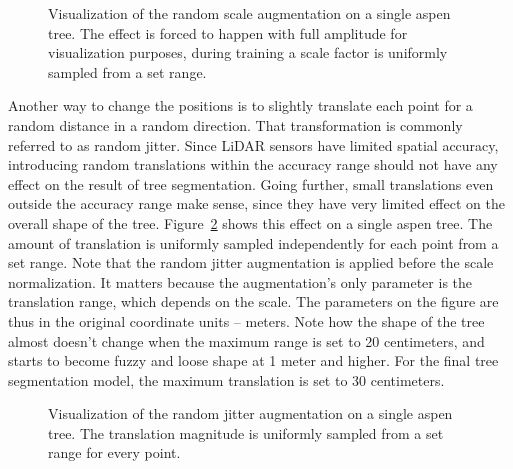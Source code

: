 \begin{figure}
\caption[Visualization of the random scale augmentation on a single aspen tree.]{\label{fig-random-scale-effect}Visualization of the random
scale augmentation on a single aspen tree. The effect is forced to
happen with full amplitude for visualization purposes, during training a
scale factor is uniformly sampled from a set range.}
\end{figure}

Another way to change the positions is to slightly translate each point for a random distance in a random direction.
That transformation is commonly referred to as random jitter.
Since LiDAR sensors have limited spatial accuracy, introducing random translations within the accuracy range should not have any effect on the result of tree segmentation.
Going further, small translations even outside the accuracy range make sense, since they have very limited effect on the overall shape of the tree.
Figure~\ref{fig-random-jitter-effect} shows this effect on a single aspen tree.
The amount of translation is uniformly sampled independently for each point from a set range.
Note that the random jitter augmentation is applied before the scale normalization.
It matters because the augmentation's only parameter is the translation range, which depends on the scale.
The parameters on the figure are thus in the original coordinate units – meters.
Note how the shape of the tree almost doesn't change when the maximum range is set to 20 centimeters, and starts to become fuzzy and loose shape at 1 meter and higher.
For the final tree segmentation model, the maximum translation is set to 30 centimeters.

\begin{figure}
\caption[Visualization of the random jitter augmentation on a single aspen tree.]{\label{fig-random-jitter-effect}Visualization of the random
jitter augmentation on a single aspen tree. The translation magnitude is
uniformly sampled from a set range for every point.}
\end{figure}

